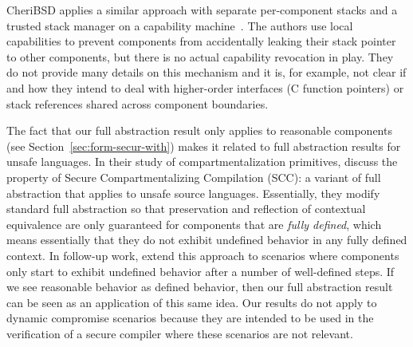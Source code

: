 \documentclass[acmsmall,screen]{acmart}\settopmatter{}
\begin{document}
CheriBSD applies a similar approach with separate per-component stacks and a trusted stack manager on a capability machine~\cite{watson_cheri_2015}.
The authors use local capabilities to prevent components from accidentally leaking their stack pointer to other components, but there is no actual capability revocation in play.
They do not provide many details on this mechanism and it is, for example, not clear if and how they intend to deal with higher-order interfaces (C function pointers) or stack references shared across component boundaries. 

The fact that our full abstraction result only applies to reasonable components (see Section~\ref{sec:form-secur-with}) makes it related to full abstraction results for unsafe languages.
In their study of compartmentalization primitives,  discuss the property of Secure Compartmentalizing Compilation (SCC): a variant of full abstraction that applies to unsafe source languages.
Essentially, they modify standard full abstraction so that preservation and reflection of contextual equivalence are only guaranteed for components that are {\itshape fully defined}, which means essentially that they do not exhibit undefined behavior in any fully defined context.
In follow-up work, \citet{Abate:2018:GCG:3243734.3243745} extend this approach to scenarios where components only start to exhibit undefined behavior after a number of well-defined steps. 
If we see reasonable behavior as defined behavior, then our full abstraction result can be seen as an application of this same idea.
Our results do not apply to dynamic compromise scenarios because they are intended to be used in the verification of a secure compiler where these scenarios are not relevant.


\end{document}
